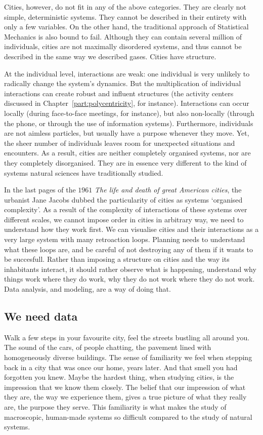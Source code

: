 Cities, however, do not fit in any of the above categories. They are clearly not
simple, deterministic systems. They cannot be described in their entirety with
only a few variables. On the other hand, the traditional approach of Statistical
Mechanics is also bound to fail. Although they can contain several million of
individuals, cities are not maximally disordered systems, and thus cannot be
described in the same way we described gases. Cities have structure. 

At the individual level, interactions are weak: one individual is very unlikely
to radically change the system's dynamics. But the multiplication of individual
interactions can create robust and influent structures (the activity centers
discussed in Chapter~\ref{part:polycentricity}, for instance). Interactions can
occur locally (during face-to-face meetings, for instance), but also non-locally
(through the phone, or through the use of information systems). Furthermore,
individuals are not aimless particles, but usually have a purpose whenever they
move. Yet, the sheer number of individuals leaves room for unexpected situations
and encounters. As a result, cities are neither completely organised systems,
nor are they completely disorganised. They are in essence very different to the
kind of systems natural sciences have traditionally studied. 

In the last pages of the $1961$ \emph{The life and death of great American
cities}, the urbanist Jane Jacobs dubbed the particularity of cities as systems
`organised complexity'. As a result of the complexity of interactions of these
systems over different scales, we cannot impose order in cities in arbitrary
way, we need to understand how they work first. We can visualise cities and
their interactions as a very large system with many retroaction loops. Planning
needs to understand what these loops are, and be careful of not destroying any
of them if it wants to be succesfull. Rather than imposing a structure on cities
and the way its inhabitants interact, it should rather observe what is
happening, understand why things work where they do work, why they do not work
where they do not work.  Data analysis, and modeling, are a way of doing that.


\subsection{We need data}
\label{sub:we_need_data}

Walk a few steps in your favourite city, feel the streets bustling all around
you. The sound of the cars, of people chatting, the pavement lined with
 homogeneously diverse buildings. The sense of familiarity we feel when stepping
back in a city that was once our home, years later. And that smell you had
forgotten you knew. Maybe the hardest thing, when studying cities, is the
impression that we know them closely. The belief that our impression of what
they are, the way we experience them, gives a true picture of what they really
are, the purpose they serve. This familiarity is what makes the study of
macroscopic, human-made systems so difficult compared to the study of natural
systems. 

